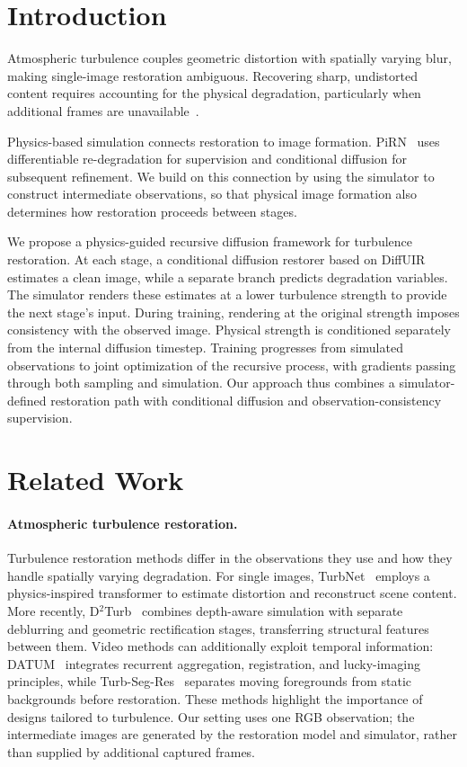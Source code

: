 \section{Introduction}
\label{sec:introduction}

Atmospheric turbulence couples geometric distortion with spatially varying blur, making single-image restoration ambiguous.
Recovering sharp, undistorted content requires accounting for the physical degradation, particularly when additional frames are unavailable~\cite{mao2022turbnet,jaiswal2023pirn}.

Physics-based simulation connects restoration to image formation.
PiRN~\cite{jaiswal2023pirn} uses differentiable re-degradation for supervision and conditional diffusion for subsequent refinement.
We build on this connection by using the simulator to construct intermediate observations, so that physical image formation also determines how restoration proceeds between stages.

We propose a physics-guided recursive diffusion framework for turbulence restoration.
At each stage, a conditional diffusion restorer based on DiffUIR~\cite{zheng2024diffuir} estimates a clean image, while a separate branch predicts degradation variables.
The simulator renders these estimates at a lower turbulence strength to provide the next stage's input.
During training, rendering at the original strength imposes consistency with the observed image.
Physical strength is conditioned separately from the internal diffusion timestep.
Training progresses from simulated observations to joint optimization of the recursive process, with gradients passing through both sampling and simulation.
Our approach thus combines a simulator-defined restoration path with conditional diffusion and observation-consistency supervision.

\section{Related Work}
\label{sec:related_work}

\paragraph{Atmospheric turbulence restoration.}
Turbulence restoration methods differ in the observations they use and how they handle spatially varying degradation.
For single images, TurbNet~\cite{mao2022turbnet} employs a physics-inspired transformer to estimate distortion and reconstruct scene content.
More recently, D$^2$Turb~\cite{hu2026d2turb} combines depth-aware simulation with separate deblurring and geometric rectification stages, transferring structural features between them.
Video methods can additionally exploit temporal information: DATUM~\cite{zhang2024datum} integrates recurrent aggregation, registration, and lucky-imaging principles, while Turb-Seg-Res~\cite{saha2024turbseg} separates moving foregrounds from static backgrounds before restoration.
These methods highlight the importance of designs tailored to turbulence.
Our setting uses one RGB observation; the intermediate images are generated by the restoration model and simulator, rather than supplied by additional captured frames.

